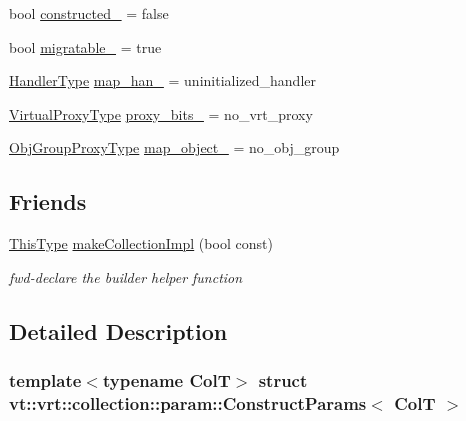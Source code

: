 \begin{DoxyCompactItemize}
\item 
bool \hyperlink{structvt_1_1vrt_1_1collection_1_1param_1_1_construct_params_afa286d4b8ca9798c7cf70f2a039ee49d}{constructed\+\_\+} = false
\item 
bool \hyperlink{structvt_1_1vrt_1_1collection_1_1param_1_1_construct_params_a811d67f8d46e6b6ad2736bba81201354}{migratable\+\_\+} = true
\item 
\hyperlink{namespacevt_af64846b57dfcaf104da3ef6967917573}{Handler\+Type} \hyperlink{structvt_1_1vrt_1_1collection_1_1param_1_1_construct_params_adfb5a4ecef96e720c6f8d48ac3f52706}{map\+\_\+han\+\_\+} = uninitialized\+\_\+handler
\item 
\hyperlink{namespacevt_a1b417dd5d684f045bb58a0ede70045ac}{Virtual\+Proxy\+Type} \hyperlink{structvt_1_1vrt_1_1collection_1_1param_1_1_construct_params_a459e1541fd22e637a616ca1f1f899124}{proxy\+\_\+bits\+\_\+} = no\+\_\+vrt\+\_\+proxy
\item 
\hyperlink{namespacevt_ad7cae989df485fccca57f0792a880a8e}{Obj\+Group\+Proxy\+Type} \hyperlink{structvt_1_1vrt_1_1collection_1_1param_1_1_construct_params_a91859be49e51c141fd83e27499d5d582}{map\+\_\+object\+\_\+} = no\+\_\+obj\+\_\+group
\end{DoxyCompactItemize}
\subsection*{Friends}
\begin{DoxyCompactItemize}
\item 
\hyperlink{structvt_1_1vrt_1_1collection_1_1param_1_1_construct_params_a13d4910c0f6825c7b0ddfebce5288bea}{This\+Type} \hyperlink{structvt_1_1vrt_1_1collection_1_1param_1_1_construct_params_a5953d04785ee9f3eeaab29a45a012076}{make\+Collection\+Impl} (bool const)
\begin{DoxyCompactList}\small\item\em fwd-\/declare the builder helper function \end{DoxyCompactList}\end{DoxyCompactItemize}


\subsection{Detailed Description}
\subsubsection*{template$<$typename ColT$>$\newline
struct vt\+::vrt\+::collection\+::param\+::\+Construct\+Params$<$ Col\+T $>$}


